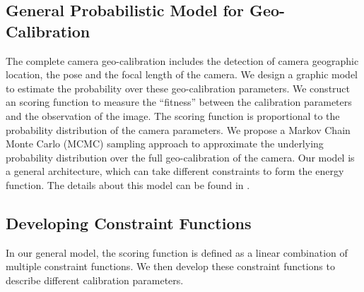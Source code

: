 \subsection{General Probabilistic Model for Geo-Calibration}
The complete camera geo-calibration includes the detection of camera
geographic location, the pose and the focal length of the camera.  We
design a graphic model to estimate the probability over these
geo-calibration parameters. 
We construct an scoring function to measure the ``fitness'' between
the calibration parameters and the observation of the image. The
scoring function is proportional to the probability distribution of
the camera parameters. We propose a Markov Chain Monte Carlo (MCMC)
sampling approach to approximate the underlying probability
distribution over the full geo-calibration of the camera.
Our model is a general architecture, which can take different
constraints to form the energy function. The details about this model
can be found in .

\subsection{Developing Constraint Functions}
In our general model, the scoring function is defined as a linear
combination of multiple constraint functions. We then develop
these constraint functions to describe different calibration
parameters.


